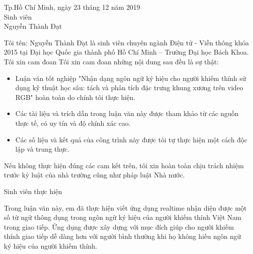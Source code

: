 \begin{center}
\hspace{7cm} Tp.Hồ Chí Minh, ngày 23 tháng 12 năm 2019 \\
\hspace{7cm} Sinh viên \\
\hspace{7cm} Nguyễn Thành Đạt
\end{center}



\newpage
{}
\thispagestyle{loi_cam_doan}
\begin{center}
{}
\end{center}

\noindent Tôi tên: Nguyễn Thành Đạt là sinh viên chuyên ngành Điện tử - Viễn thông khóa 2015 tại Đại học Quốc gia thành phố Hồ Chí Minh – Trường Đại học Bách Khoa. Tôi xin cam đoan Tôi xin cam đoan những nội dung sau đều là sự thật:
\begin{itemize}
\item Luận văn tốt nghiệp "Nhận dạng ngôn ngữ ký hiệu cho người khiếm thính sử dụng kỹ thuật học sâu: tách và phân tích đặc trưng khung xương trên video RGB" hoàn toàn do chính tôi thực hiện.
\item Các tài liệu và trích dẫn trong luận văn này được tham khảo từ các nguồn thực tế, có uy tín và độ chính xác cao.
\item Các số liệu và kết quả của công trình này được tôi tự thực hiện một cách độc lập và trung thực.
\end{itemize}

Nếu không thực hiện đúng các cam kết trên, tôi xin hoàn toàn chịu trách nhiệm trước kỷ luật của nhà trường cũng như pháp luật Nhà nước.
\\
[3cm]
\begin{center}
\hspace{7cm} Sinh viên thực hiện
\end{center}


\newpage
{}
\thispagestyle{tom_tat}
\begin{center}
{}
\end{center}

Trong luận văn này, em đã thực hiện viết ứng dụng realtime nhận diện được một số từ ngữ thông dụng trong ngôn ngữ ký hiệu của người khiếm thính Việt Nam trong giao tiếp. Ứng dụng được xây dựng với mục đích giúp cho người khiếm thính giao tiếp dễ dàng hơn với người bình thường khi họ không hiếu ngôn ngữ ký hiệu của người khiếm thính.

